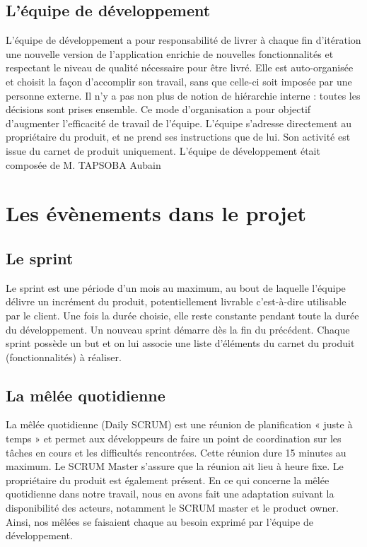 \documentclass[a4paper,12pt]{book}
\theoremstyle{break}
\begin{document}
\subsection{L'équipe de développement}
L'équipe de développement a pour responsabilité de livrer à chaque fin d'itération une nouvelle version de l'application enrichie de nouvelles fonctionnalités et respectant le niveau de qualité nécessaire pour être livré. Elle est auto-organisée et choisit la façon d'accomplir son travail, sans que celle-ci soit imposée par une personne externe. Il n'y a pas non plus de notion de hiérarchie interne : toutes les décisions sont prises ensemble. Ce mode d'organisation a pour objectif d'augmenter l'efficacité de travail de l'équipe. L'équipe s'adresse directement au propriétaire du produit, et ne prend ses instructions que de lui. Son activité est issue du carnet de produit uniquement.
L'équipe de développement était composée de M. TAPSOBA Aubain 

\section{Les évènements dans le projet}
\subsection{Le sprint}
Le sprint est une période d'un mois au maximum, au bout de laquelle l'équipe délivre un incrément du produit, potentiellement livrable c’est-à-dire utilisable par le client. Une fois la durée choisie, elle reste constante pendant toute la durée du développement. Un nouveau sprint démarre dès la fin du précédent.
Chaque sprint possède un but et on lui associe une liste d'éléments du carnet du produit (fonctionnalités) à réaliser.

\subsection{La mêlée quotidienne}
La mêlée quotidienne (Daily SCRUM) est une réunion de planification « juste à temps » et permet aux développeurs de faire un point de coordination sur les tâches en cours et les difficultés rencontrées. Cette réunion dure 15 minutes au maximum. Le SCRUM Master s'assure que la réunion ait lieu à heure fixe. Le propriétaire du produit est également présent.
En ce qui concerne la mêlée quotidienne dans notre travail, nous en avons fait une adaptation suivant la disponibilité des acteurs, notamment le SCRUM master et le product owner. Ainsi, nos mêlées se faisaient chaque au besoin exprimé par l’équipe de développement.
\end{document}
